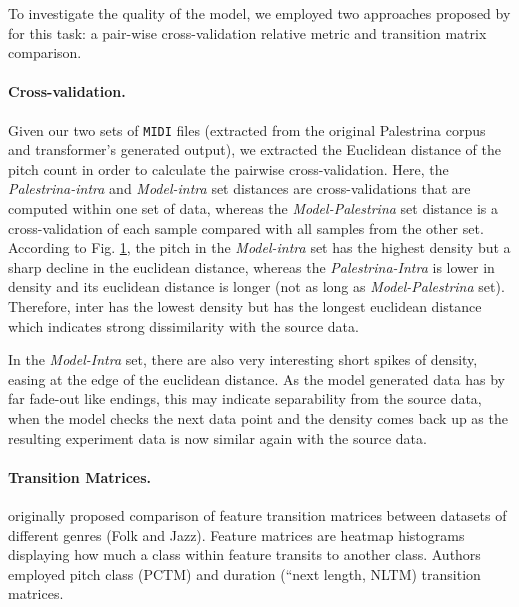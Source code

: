 \documentclass{article}
\begin{document}
\begin{multicols}{2}
        To investigate the quality of the model, we employed two approaches  proposed by \cite{yang_evaluation_2020} for this task: a pair-wise cross-validation relative metric and transition matrix comparison.
        
        \paragraph{Cross-validation.} Given our two sets of \texttt{MIDI} files (extracted from the original Palestrina corpus and transformer's generated output), we extracted the Euclidean distance of the pitch count in order to calculate the pairwise cross-validation. Here, the \emph{Palestrina-intra} and \emph{Model-intra} set distances are cross-validations that are computed within one set of data, whereas the \emph{Model-Palestrina} set distance is a cross-validation of each sample compared with all samples from the other set. According to Fig. \ref{fig:euclidean}, the pitch in the \emph{Model-intra} set has the highest density but a sharp decline in the euclidean distance, whereas the \emph{Palestrina-Intra} is lower in density and its euclidean distance is longer (not as long as \emph{Model-Palestrina} set). Therefore, inter has the lowest density but has the longest euclidean distance which indicates strong dissimilarity with the source data. 
        
        In the \emph{Model-Intra} set, there are also very interesting short spikes of density, easing at the edge of the euclidean distance. As the model generated data has by far fade-out like endings, this may indicate separability from the source data, when the model checks the next data point and the density comes back up as the resulting experiment data is now similar again with the source data.

        \begin{figure}[H]
            \noindent\resizebox{1\linewidth}{!}{}
            \label{fig:euclidean}
        \end{figure}

        \paragraph{Transition Matrices.} \cite{yang_evaluation_2020} originally proposed comparison of feature transition matrices between datasets of different genres (Folk and Jazz). Feature matrices are heatmap histograms displaying how much a class within feature transits to another class. Authors employed pitch class (PCTM) and duration (``next length, NLTM) transition matrices.
        

\end{multicols}
\end{document}
